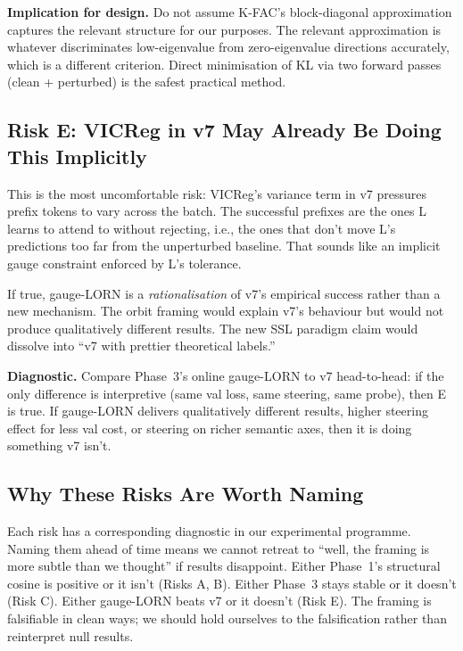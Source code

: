 \documentclass[11pt, a4paper]{article}
\theoremstyle{plain}
\theoremstyle{definition}
\theoremstyle{remark}
\begin{document}
\textbf{Implication for design.} Do not assume K-FAC's block-diagonal approximation captures the relevant structure for our purposes.
The relevant approximation is whatever discriminates low-eigenvalue from zero-eigenvalue directions accurately, which is a different criterion.
Direct minimisation of KL via two forward passes (clean + perturbed) is the safest practical method.

\subsection{Risk E: VICReg in v7 May Already Be Doing This Implicitly}

This is the most uncomfortable risk: VICReg's variance term in v7 pressures prefix tokens to vary across the batch.
The successful prefixes are the ones L learns to attend to without rejecting, i.e., the ones that don't move L's predictions too far from the unperturbed baseline.
That sounds like an implicit gauge constraint enforced by L's tolerance.

If true, gauge-LORN is a \emph{rationalisation} of v7's empirical success rather than a new mechanism.
The orbit framing would explain v7's behaviour but would not produce qualitatively different results.
The new SSL paradigm claim would dissolve into ``v7 with prettier theoretical labels.''

\textbf{Diagnostic.} Compare Phase~3's online gauge-LORN to v7 head-to-head: if the only difference is interpretive (same val loss, same steering, same probe), then E is true.
If gauge-LORN delivers qualitatively different results, higher steering effect for less val cost, or steering on richer semantic axes, then it is doing something v7 isn't.

\subsection{Why These Risks Are Worth Naming}

Each risk has a corresponding diagnostic in our experimental programme. Naming them ahead of time means we cannot retreat to ``well, the framing is more subtle than we thought'' if results disappoint. Either Phase~1's structural cosine is positive or it isn't (Risks A, B). Either Phase~3 stays stable or it doesn't (Risk C). Either gauge-LORN beats v7 or it doesn't (Risk E). The framing is falsifiable in clean ways; we should hold ourselves to the falsification rather than reinterpret null results.
\end{document}
